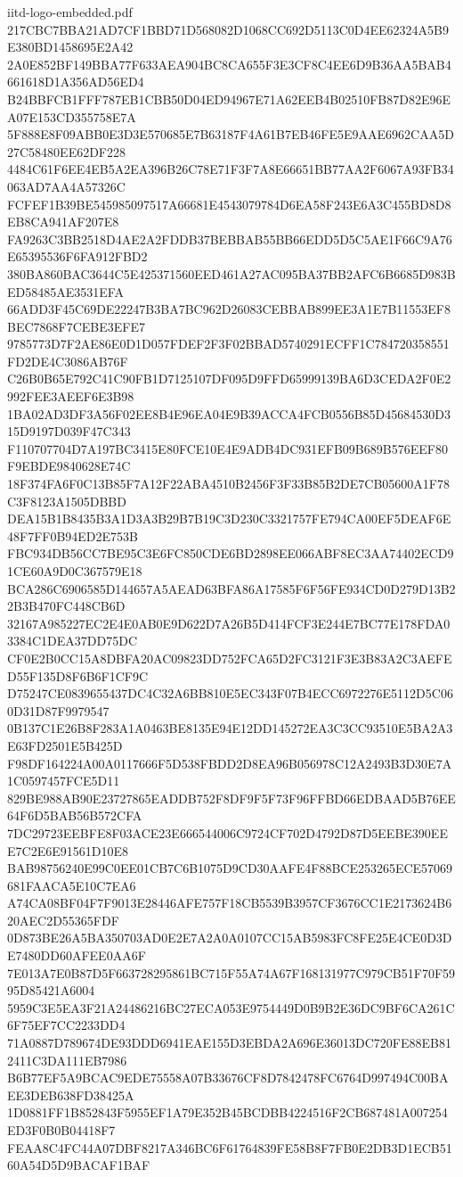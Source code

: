 \begin{filecontents*}[overwrite]{iitd-logo-embedded.pdf}
217CBC7BBA21AD7CF1BBD71D568082D1068CC692D5113C0D4EE62324A5B9E380BD1458695E2A42
2A0E852BF149BBA77F633AEA904BC8CA655F3E3CF8C4EE6D9B36AA5BAB4661618D1A356AD56ED4
B24BBFCB1FFF787EB1CBB50D04ED94967E71A62EEB4B02510FB87D82E96EA07E153CD355758E7A
5F888E8F09ABB0E3D3E570685E7B63187F4A61B7EB46FE5E9AAE6962CAA5D27C58480EE62DF228
4484C61F6EE4EB5A2EA396B26C78E71F3F7A8E66651BB77AA2F6067A93FB34063AD7AA4A57326C
FCFEF1B39BE545985097517A66681E4543079784D6EA58F243E6A3C455BD8D8EB8CA941AF207E8
FA9263C3BB2518D4AE2A2FDDB37BEBBAB55BB66EDD5D5C5AE1F66C9A76E65395536F6FA912FBD2
380BA860BAC3644C5E425371560EED461A27AC095BA37BB2AFC6B6685D983BED58485AE3531EFA
66ADD3F45C69DE22247B3BA7BC962D26083CEBBAB899EE3A1E7B11553EF8BEC7868F7CEBE3EFE7
9785773D7F2AE86E0D1D057FDEF2F3F02BBAD5740291ECFF1C784720358551FD2DE4C3086AB76F
C26B0B65E792C41C90FB1D7125107DF095D9FFD65999139BA6D3CEDA2F0E2992FEE3AEEF6E3B98
1BA02AD3DF3A56F02EE8B4E96EA04E9B39ACCA4FCB0556B85D45684530D315D9197D039F47C343
F110707704D7A197BC3415E80FCE10E4E9ADB4DC931EFB09B689B576EEF80F9EBDE9840628E74C
18F374FA6F0C13B85F7A12F22ABA4510B2456F3F33B85B2DE7CB05600A1F78C3F8123A1505DBBD
DEA15B1B8435B3A1D3A3B29B7B19C3D230C3321757FE794CA00EF5DEAF6E48F7FF0B94ED2E753B
FBC934DB56CC7BE95C3E6FC850CDE6BD2898EE066ABF8EC3AA74402ECD91CE60A9D0C367579E18
BCA286C6906585D144657A5AEAD63BFA86A17585F6F56FE934CD0D279D13B22B3B470FC448CB6D
32167A985227EC2E4E0AB0E9D622D7A26B5D414FCF3E244E7BC77E178FDA03384C1DEA37DD75DC
CF0E2B0CC15A8DBFA20AC09823DD752FCA65D2FC3121F3E3B83A2C3AEFED55F135D8F6B6F1CF9C
D75247CE0839655437DC4C32A6BB810E5EC343F07B4ECC6972276E5112D5C060D31D87F9979547
0B137C1E26B8F283A1A0463BE8135E94E12DD145272EA3C3CC93510E5BA2A3E63FD2501E5B425D
F98DF164224A00A0117666F5D538FBDD2D8EA96B056978C12A2493B3D30E7A1C0597457FCE5D11
829BE988AB90E23727865EADDB752F8DF9F5F73F96FFBD66EDBAAD5B76EE64F6D5BAB56B572CFA
7DC29723EEBFE8F03ACE23E666544006C9724CF702D4792D87D5EEBE390EEE7C2E6E91561D10E8
BAB98756240E99C0EE01CB7C6B1075D9CD30AAFE4F88BCE253265ECE57069681FAACA5E10C7EA6
A74CA08BF04F7F9013E28446AFE757F18CB5539B3957CF3676CC1E2173624B620AEC2D55365FDF
0D873BE26A5BA350703AD0E2E7A2A0A0107CC15AB5983FC8FE25E4CE0D3DE7480DD60AFEE0AA6F
7E013A7E0B87D5F663728295861BC715F55A74A67F168131977C979CB51F70F5995D85421A6004
5959C3E5EA3F21A24486216BC27ECA053E9754449D0B9B2E36DC9BF6CA261C6F75EF7CC2233DD4
71A0887D789674DE93DDD6941EAE155D3EBDA2A696E36013DC720FE88EB812411C3DA111EB7986
B6B77EF5A9BCAC9EDE75558A07B33676CF8D7842478FC6764D997494C00BAEE3DEB638FD38425A
1D0881FF1B852843F5955EF1A79E352B45BCDBB4224516F2CB687481A007254ED3F0B0B04418F7
FEAA8C4FC44A07DBF8217A346BC6F61764839FE58B8F7FB0E2DB3D1ECB5160A54D5D9BACAF1BAF

\end{filecontents*}
